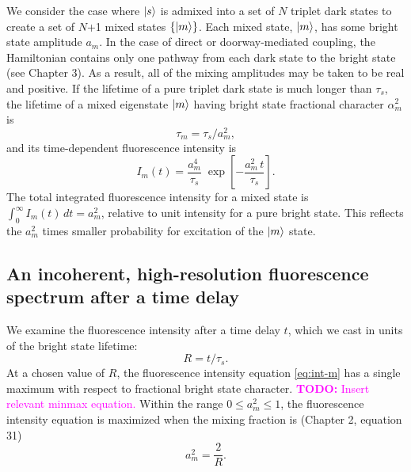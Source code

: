 \documentclass[12pt,draft]{mitthesis}
\newcommand{\TODO} [1]{\textcolor{magenta}{\textbf{TODO:} #1}}
\begin{document}
We consider the case where $\mathinner{|{s}\rangle}$ is admixed into a set of $N$
triplet dark states to create a set of $N$+1 mixed states
$\lbrace\mathinner{|{m}\rangle}\rbrace$.  Each mixed state, $\mathinner{|{m}\rangle}$, has some bright
state amplitude $a_m$.  In the case of direct or doorway-mediated
coupling, the Hamiltonian contains only one pathway from each dark
state to the bright state (see Chapter 3).  As a result, all of the
mixing amplitudes may be taken to be real and positive.  If the
lifetime of a pure triplet dark state is much longer than $\tau_s$,
the lifetime of a mixed eigenstate $\mathinner{|{m}\rangle}$ having bright state
fractional character $\alpha_m^2$ is
\begin{equation}
  \label{eq:tau-m}
  \tau_m = \tau_s / a_m^2,
\end{equation}
and its time-dependent fluorescence intensity is
\begin{equation}
  \label{eq:int-m}
  I_m(t) = \frac{a_m^4}{\tau_s} \;
           \exp \left[
             -\frac{a_m^2 \, t}{\tau_s} 
           \right].
\end{equation}
The total integrated fluorescence intensity for a mixed state is
$\int_0^{\infty} I_m(t) \, dt = a_m^2$, relative to unit intensity for
a pure bright state.  This reflects the $a_m^2$ times smaller
probability for excitation of the $\mathinner{|{m}\rangle}$ state.


\subsection{An incoherent, high-resolution fluorescence spectrum after
  a time delay}

We examine the fluorescence intensity after a time delay $t$,
which we cast in units of the bright state lifetime:
\begin{equation}
  R = t / \tau_s.
\end{equation}
At a chosen value of $R$, the fluorescence intensity equation
\ref{eq:int-m} has a single maximum with respect to fractional bright
state character.  \TODO{Insert relevant minmax equation.}  Within the
range $0 \le a_m^2 \le 1$, the fluorescence intensity equation is
maximized when the mixing fraction is (Chapter 2, equation 31)
\begin{equation}
  \label{eq:am-max}
  a_m^2 = \frac{2}{R}.
\end{equation}
\end{document}
